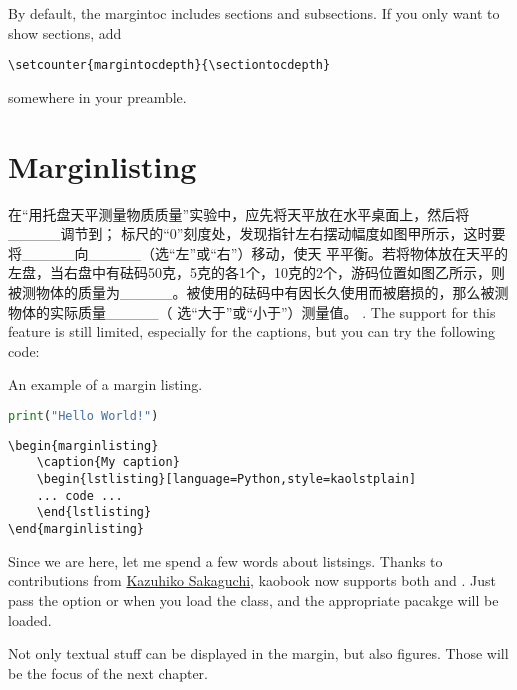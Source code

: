 By default, the margintoc includes sections and subsections.
If you only want to show sections, add
\begin{lstlisting}[style=kaolstplain]
\setcounter{margintocdepth}{\sectiontocdepth}
\end{lstlisting}
somewhere in your preamble.

\section{Marginlisting}

在“用托盘天平测量物质质量”实验中，应先将天平放在水平桌面上，然后将_____调节到；
标尺的“0”刻度处，发现指针左右摆动幅度如图甲所示，这时要将_____向_____（选“左”或“右”）移动，使天
平平衡。若将物体放在天平的左盘，当右盘中有砝码50克，5克的各1个，10克的2个，游码位置如图乙所示，则
被测物体的质量为_____。被使用的砝码中有因长久使用而被磨损的，那么被测物体的实际质量_____（
选“大于”或“小于”）测量值。
. The support for this feature is still 
limited, especially for the captions, but you can try the following 
code:

\begin{marginlisting}
	\caption{An example of a margin listing.}
	\begin{lstlisting}[language=Python,style=kaolstplain]
print("Hello World!")
	\end{lstlisting}
\end{marginlisting}

\begin{verbatim}
\begin{marginlisting}
	\caption{My caption}
	\begin{lstlisting}[language=Python,style=kaolstplain]
	... code ...
	\end{lstlisting}
\end{marginlisting}
\end{verbatim}

Since we are here, let me spend a few words about listsings. Thanks to contributions from \href{https://github.com/fmarotta/kaobook/pull/225}{Kazuhiko Sakaguchi}, kaobook now supports both  and . Just pass the option  or  when you load the  class, and the appropriate pacakge will be loaded.

Not only textual stuff can be displayed in the margin, but also figures. 
Those will be the focus of the next chapter.
